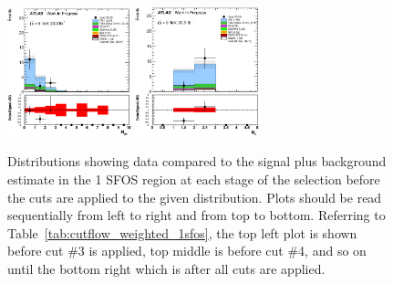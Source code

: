 \begin{figure}[ht!]
\includegraphics[width=0.32\textwidth]{figures/appendix_signal_selection/Nov24Update_FakeSys_KFacSys_LinearY_Rebin/output/jobs/MxM/DataFull_Rates_May13_FakeRatesExactly2Loose_MuonMxMBJetGt0_ElBJetGt0SubtractPC_MxM/PreselectionNov23_15_1SFOS_ChargeAbs1_BVeto85_ZVetoLow35High25GeV_METGt45GeV_DeltaPhi2p5_physics/weight_all/eps/NJets_histratio.eps}
\includegraphics[width=0.32\textwidth]{figures/appendix_signal_selection/Nov24Update_FakeSys_KFacSys_LinearY_Rebin/output/jobs/MxM/DataFull_Rates_May13_FakeRatesExactly2Loose_MuonMxMBJetGt0_ElBJetGt0SubtractPC_MxM/PreselectionNov23_15_1SFOS_ChargeAbs1_BVeto85_ZVetoLow35High25GeV_METGt45GeV_DeltaPhi2p5_NJetLt2_physics/weight_all/eps/NMuons_histratio.eps}


\caption{Distributions showing data compared to the signal plus background estimate in the 1 SFOS region at each stage 
of the selection before the cuts are applied to the given distribution. Plots should be read sequentially from left to right
and from top to bottom. 
Referring to Table~\ref{tab:cutflow_weighted_1sfos}, the top left
plot is shown before cut \#3 is applied, top middle is before cut \#4, and
so on until the bottom right which is after all cuts are applied.}
\label{fig:1sfos}
\end{figure}



